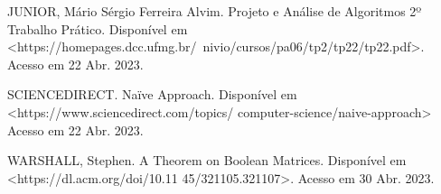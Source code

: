JUNIOR, Mário Sérgio Ferreira Alvim. Projeto e Análise de Algoritmos 2º Trabalho Prático. Disponível em <https://homepages.dcc.ufmg.br/~nivio/cursos/pa06/tp2/tp22/tp22.pdf>. Acesso em 22 Abr. 2023.

\vspace{\baselineskip}

SCIENCEDIRECT. Naïve Approach. Disponível em <https://www.sciencedirect.com/topics/
computer-science/naive-approach> Acesso em 22 Abr. 2023.

\vspace{\baselineskip}

WARSHALL, Stephen. A Theorem on Boolean Matrices. Disponível em <https://dl.acm.org/doi/10.11
45/321105.321107>. Acesso em 30 Abr. 2023.
